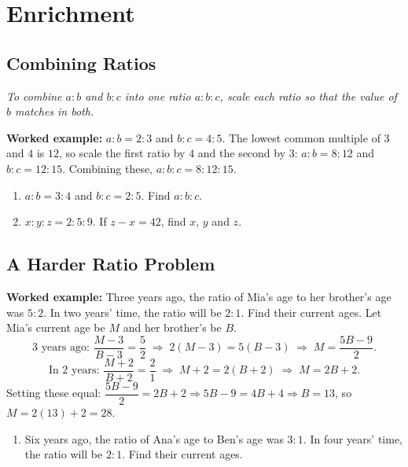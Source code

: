 \documentclass[11pt]{article}
\newcommand{\ans}{\hrulefill}
\newcommand{\anshere}{\par\vspace{0.9em}\noindent\ans\par\vspace{1.3em}}
\begin{document}
\newpage

\section*{Enrichment}

\renewcommand{\anshere}{\par\vspace{3.6em}\noindent\ans\par\vspace{4.8em}}

\subsection*{Combining Ratios}
\noindent\textit{To combine $a:b$ and $b:c$ into one ratio $a:b:c$, scale each
ratio so that the value of $b$ matches in both.}

\vspace{0.3em}
\noindent\textbf{Worked example:} $a:b=2:3$ and $b:c=4:5$. The lowest common
multiple of $3$ and $4$ is $12$, so scale the first ratio by $4$ and the second by
$3$: $a:b=8:12$ and $b:c=12:15$. Combining these, $a:b:c=8:12:15$.

\vspace{0.3em}
\begin{enumerate}[label=(\alph*)]
  \item $a:b=3:4$ and $b:c=2:5$. Find $a:b:c$.
  \anshere
  \item $x:y:z=2:5:9$. If $z-x=42$, find $x$, $y$ and $z$.
  \anshere
\end{enumerate}

\subsection*{A Harder Ratio Problem}
\noindent\textbf{Worked example:} Three years ago, the ratio of Mia's age to her
brother's age was $5:2$. In two years' time, the ratio will be $2:1$. Find their
current ages. Let Mia's current age be $M$ and her brother's be $B$.
\[\text{3 years ago: } \frac{M-3}{B-3}=\frac{5}{2} \;\Rightarrow\; 2(M-3)=5(B-3)
  \;\Rightarrow\; M = \frac{5B-9}{2}.\]
\[\text{In 2 years: } \frac{M+2}{B+2}=\frac{2}{1} \;\Rightarrow\; M+2=2(B+2)
  \;\Rightarrow\; M=2B+2.\]
Setting these equal: $\dfrac{5B-9}{2}=2B+2 \Rightarrow 5B-9=4B+4 \Rightarrow B=13$,
so $M=2(13)+2=28$.

\vspace{0.3em}
\begin{enumerate}[label=(\alph*)]
  \item Six years ago, the ratio of Ana's age to Ben's age was $3:1$. In four
    years' time, the ratio will be $2:1$. Find their current ages.
  \anshere
\end{enumerate}
\end{document}

